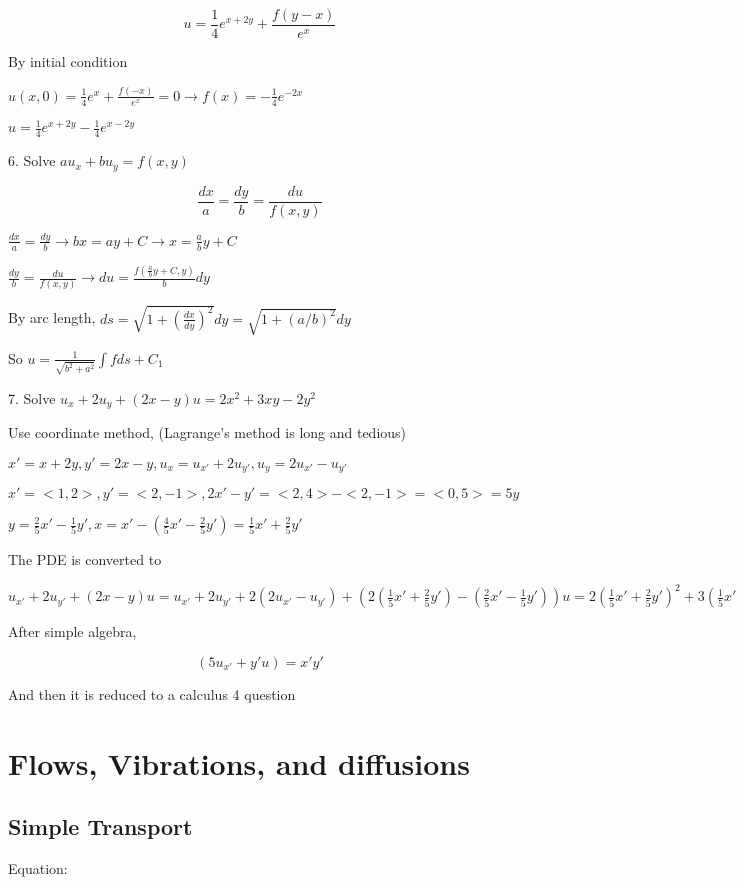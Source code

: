 \documentclass{article}
\begin{document}
$$ u = \frac{1}{4}e^{x+2y} + \frac{f(y-x)}{e^x}$$

By initial condition

$u(x,0) = \frac{1}{4}e^{x} + \frac{f(-x)}{e^x} = 0 \rightarrow f(x) = -\frac{1}{4}e^{-2x}$

$u = \frac{1}{4}e^{x+2y} - \frac{1}{4}e^{x-2y}$

6. Solve $au_x+bu_y = f(x,y)$

$$\frac{dx}{a} = \frac{dy}{b} = \frac{du}{f(x,y)}$$

$\frac{dx}{a} = \frac{dy}{b} \rightarrow bx = ay+C \rightarrow x = \frac{a}{b} y + C$

$\frac{dy}{b} = \frac{du}{f(x,y)} \rightarrow du  = \frac{f(\frac{a}{b} y + C,y)}{b} dy$

By arc length, $ds = \sqrt{1+(\frac{dx}{dy})^2} dy = \sqrt{1+(a/b)^2} dy$

So $u = \frac{1}{\sqrt{b^2+a^2}} \int f ds+C_1$

7. Solve $u_x+2u_y+(2x-y)u = 2x^2+3xy-2y^2$

Use coordinate method, (Lagrange's method is long and tedious)

$x' = x+2y,y'=2x-y,u_{x} = u_{x'}+2u_{y'},u_{y} = 2u_{x'}-u_{y'}$

$x' = <1,2>, y'=<2,-1>, 2x'-y'=<2,4>-<2,-1>=<0,5> = 5y$

$y = \frac{2}{5} x' - \frac{1}{5} y', x = x' - (\frac{4}{5} x' - \frac{2}{5} y') = \frac{1}{5} x' + \frac{2}{5} y'$

The PDE is converted to 

$u_{x'}+2u_{y'} +(2x-y)u = u_{x'}+2u_{y'}+ 2(2u_{x'}-u_{y'}) + (2(\frac{1}{5} x' + \frac{2}{5} y')-(\frac{2}{5} x' - \frac{1}{5} y'))u = 2(\frac{1}{5} x' + \frac{2}{5} y')^2+3(\frac{1}{5} x' + \frac{2}{5} y')(\frac{2}{5} x' - \frac{1}{5} y')-2(\frac{2}{5} x' - \frac{1}{5} y')^2 $

After simple algebra,

$$ (5u_{x'}+ y'u) = x'y'$$

And then it is reduced to a calculus 4 question

\section{Flows, Vibrations, and diffusions}

\subsection{Simple Transport}
Equation:
\end{document}
